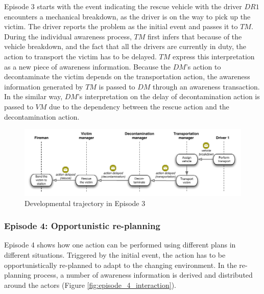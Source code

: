 Episode 3 starts with the event indicating the rescue vehicle with the driver $DR1$ encounters a mechanical breakdown, as the driver is on the way to pick up the victim. The driver reports the problem as the initial event and passes it to $TM$. During the individual awareness process, $TM$ first infers that because of the vehicle breakdown, and the fact that all the drivers are currently in duty, the action to transport the victim has to be delayed. $TM$ express this interpretation as a new piece of awareness information. Because the $DM$'s action to decontaminate the victim depends on the transportation action, the awareness information generated by $TM$ is passed to $DM$ through an awareness transaction. In the similar way, $DM$'s interpretation on the delay of decontamination action is passed to $VM$ due to the dependency between the rescue action and the decontamination action. 

\begin{figure}[htbp] %
   \centering
   \includegraphics[width=5.8in]{episode_3_interaction.pdf} 
   \caption{Developmental trajectory in Episode 3}
   \label{fig:episode_3_interaction}
\end{figure}

\subsubsection{Episode 4: Opportunistic re-planning} %
\label{ssub:episode_4_opportunistic_re_planning}
Episode 4 shows how one action can be performed using different plans in different situations. Triggered by the initial event, the action has to be opportunistically re-planned to adapt to the changing environment. In the re-planning process, a number of awareness information is derived and distributed around the actors (Figure \ref{fig:episode_4_interaction}).


